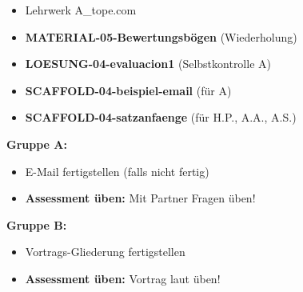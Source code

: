 \documentclass[11pt, a4paper]{article}
\begin{document}
\begin{minipage}[t]{0.48\textwidth}
\begin{tcolorbox}[
    colback=hellgrau,
    colframe=phase,
    title={\footnotesize\bfseries Material-Checkliste},
    fonttitle=\bfseries,
    boxrule=0.5pt,
    top=2pt, bottom=2pt, left=4pt, right=4pt
]
\footnotesize
\begin{itemize}
\item[$\square$] Lehrwerk A\_tope.com
\item[$\square$] \textbf{MATERIAL-05-Bewertungsbögen} (Wiederholung)
\item[$\square$] \textbf{LOESUNG-04-evaluacion1} (Selbstkontrolle A)
\item[$\square$] \textbf{SCAFFOLD-04-beispiel-email} (für A)
\item[$\square$] \textbf{SCAFFOLD-04-satzanfaenge} (für H.P., A.A., A.S.)
\end{itemize}
\end{tcolorbox}
\end{minipage}
\hfill
\begin{minipage}[t]{0.48\textwidth}
\begin{tcolorbox}[
    colback=spanisch!10,
    colframe=spanisch,
    title={\footnotesize\bfseries Hausaufgabe},
    fonttitle=\bfseries,
    boxrule=0.5pt,
    top=2pt, bottom=2pt, left=4pt, right=4pt
]
\footnotesize
\textbf{Gruppe A:}
\begin{itemize}
\item E-Mail fertigstellen (falls nicht fertig)
\item \textbf{Assessment üben:} Mit Partner Fragen üben!
\end{itemize}
\textbf{Gruppe B:}
\begin{itemize}
\item Vortrags-Gliederung fertigstellen
\item \textbf{Assessment üben:} Vortrag laut üben!
\end{itemize}
\end{tcolorbox}
\end{minipage}

\vspace{0.2cm}

\end{document}
